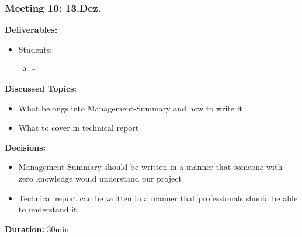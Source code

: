 \subsubsection*{Meeting 10: 13.Dez.}
\textbf{Deliverables:}
\begin{itemize}
    \item Students:
    \begin{itemize}
        \item -
    \end{itemize}
\end{itemize} 
\textbf{Discussed Topics:}
\begin{itemize}
    \item What belongs into Management-Summary and how to write it
    \item What to cover in technical report
\end{itemize}
\textbf{Decisions:}
\begin{itemize}
    \item Management-Summary should be written in a manner that someone with zero knowledge would understand our project
    \item Technical report can be written in a manner that professionals should be able to understand it
\end{itemize}
\textbf{Duration:} 30min
